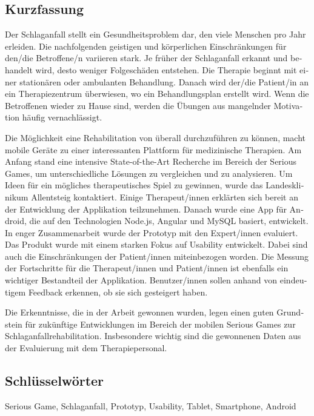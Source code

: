 
\cleardoublepage
{}




\begin{otherlanguage}{ngerman}

\chapter*{Kurzfassung}
Der Schlaganfall stellt ein Gesundheitsproblem dar, den viele Menschen pro Jahr erleiden. Die nachfolgenden geistigen und körperlichen Einschränkungen für den/die Betroffene/n variieren stark. Je früher der Schlaganfall erkannt und behandelt wird, desto weniger Folgeschäden entstehen. Die Therapie beginnt mit einer stationären oder ambulanten Behandlung. Danach wird der/die Patient/in an ein Therapiezentrum überwiesen, wo ein Behandlungsplan erstellt wird. Wenn die Betroffenen wieder zu Hause sind, werden die Übungen aus mangelnder Motivation häufig vernachlässigt.

Die Möglichkeit eine Rehabilitation von überall durchzuführen zu können, macht mobile Geräte zu einer interessanten Plattform für medizinische Therapien. Am Anfang stand eine intensive State-of-the-Art Recherche im Bereich der Serious Games, um unterschiedliche Lösungen zu vergleichen und zu analysieren. Um Ideen für ein mögliches therapeutisches Spiel zu gewinnen, wurde das Landesklinikum Allentsteig kontaktiert. Einige Therapeut/innen erklärten sich bereit an der Entwicklung der Applikation teilzunehmen. Danach wurde eine App für Android, die auf den Technologien Node.js, Angular und MySQL basiert, entwickelt. In enger Zusammenarbeit wurde der Prototyp mit den Expert/innen evaluiert. Das Produkt wurde mit einem starken Fokus auf Usability entwickelt. Dabei sind auch die Einschränkungen der Patient/innen miteinbezogen worden. Die Messung der Fortschritte für die Therapeut/innen und Patient/innen ist ebenfalls ein wichtiger Bestandteil der Applikation. Benutzer/innen sollen anhand von eindeutigem Feedback erkennen, ob sie sich gesteigert haben.
  
Die Erkenntnisse, die in der Arbeit gewonnen wurden, legen einen guten Grundstein für zukünftige Entwicklungen im Bereich der mobilen Serious Games zur Schlaganfallrehabilitation. Insbesondere wichtig sind die gewonnenen Daten aus der Evaluierung mit dem Therapiepersonal.

\bigskip

\section*{Schl\"usselw\"orter}
Serious Game, Schlaganfall, Prototyp, Usability, Tablet, Smartphone, Android
\end{otherlanguage}

